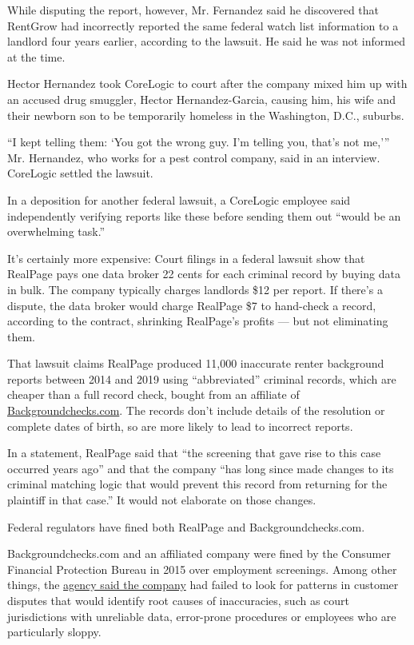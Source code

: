 While disputing the report, however, Mr. Fernandez said he discovered
that RentGrow had incorrectly reported the same federal watch list
information to a landlord four years earlier, according to the lawsuit.
He said he was not informed at the time.

Hector Hernandez took CoreLogic to court after the company mixed him up
with an accused drug smuggler, Hector Hernandez-Garcia, causing him, his
wife and their newborn son to be temporarily homeless in the Washington,
D.C., suburbs.

``I kept telling them: `You got the wrong guy. I'm telling you, that's
not me,''' Mr. Hernandez, who works for a pest control company, said in
an interview. CoreLogic settled the lawsuit.

In a deposition for another federal lawsuit, a CoreLogic employee said
independently verifying reports like these before sending them out
``would be an overwhelming task.''

It's certainly more expensive: Court filings in a federal lawsuit show
that RealPage pays one data broker 22 cents for each criminal record by
buying data in bulk. The company typically charges landlords \$12 per
report. If there's a dispute, the data broker would charge RealPage \$7
to hand-check a record, according to the contract, shrinking RealPage's
profits --- but not eliminating them.

That lawsuit claims RealPage produced 11,000 inaccurate renter
background reports between 2014 and 2019 using ``abbreviated'' criminal
records, which are cheaper than a full record check, bought from an
affiliate of
\href{https://www.backgroundchecks.com/}{Backgroundchecks.com}. The
records don't include details of the resolution or complete dates of
birth, so are more likely to lead to incorrect reports.

In a statement, RealPage said that ``the screening that gave rise to
this case occurred years ago'' and that the company ``has long since
made changes to its criminal matching logic that would prevent this
record from returning for the plaintiff in that case.'' It would not
elaborate on those changes.

Federal regulators have fined both RealPage and Backgroundchecks.com.

Backgroundchecks.com and an affiliated company were fined by the
Consumer Financial Protection Bureau in 2015 over employment screenings.
Among other things, the
\href{https://www.consumerfinance.gov/about-us/newsroom/cfpb-takes-action-against-two-of-the-largest-employment-background-screening-report-providers-for-serious-inaccuracies/}{agency
said the company} had failed to look for patterns in customer disputes
that would identify root causes of inaccuracies, such as court
jurisdictions with unreliable data, error-prone procedures or employees
who are particularly sloppy.

